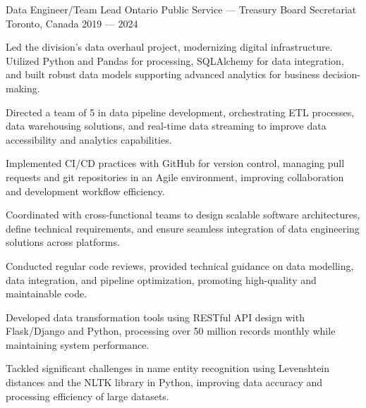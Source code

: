 \begin{cventries}
 \cventry%
 {Data Engineer/Team Lead}
 {Ontario Public Service --- Treasury Board Secretariat}
 {Toronto, Canada}
 {2019 --- 2024}
 {
   \begin{cvitems}
     \item Led the division's data overhaul project, modernizing digital infrastructure. Utilized Python and Pandas for processing, SQLAlchemy for data integration, and built robust data models supporting advanced analytics for business decision-making.
     \item Directed a team of 5 in data pipeline development, orchestrating ETL processes, data warehousing solutions, and real-time data streaming to improve data accessibility and analytics capabilities.
     \item Implemented CI/CD practices with GitHub for version control, managing pull requests and git repositories in an Agile environment, improving collaboration and development workflow efficiency.
     \item Coordinated with cross-functional teams to design scalable software architectures, define technical requirements, and ensure seamless integration of data engineering solutions across platforms.
     \item Conducted regular code reviews, provided technical guidance on data modelling, data integration, and pipeline optimization, promoting high-quality and maintainable code.
     \item Developed data transformation tools using RESTful API design with Flask/Django and Python, processing over 50 million records monthly while maintaining system performance.
     \item Tackled significant challenges in name entity recognition using Levenshtein distances and the NLTK library in Python, improving data accuracy and processing efficiency of large datasets.
   \end{cvitems}
 }


\end{cventries}

